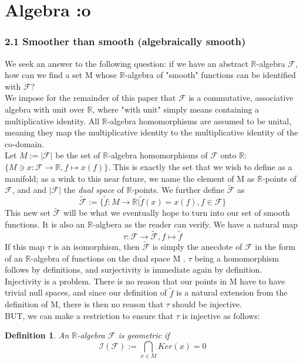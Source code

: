 \documentclass[12pt]{extarticle}
\newcommand\Reals{{\mathbb{R}}}
\newcommand{\ff}{\mathcal{F}}
\newtheorem{definition}{Definition}
\begin{document}
\part{Algebra :o}
\section*{2.1 Smoother than smooth (algebraically smooth)}
We seek an answer to the following question: if we have an abstract $\Reals$-algebra $\ff$, how can we find a set M whose $\Reals$-algebra of "smooth" functions can be identified with $\ff$?\\
We impose for the remainder of this paper that $\ff$ is a commutative, associative algebra with unit over $\Reals$, where "with unit" simply means containing a multiplicative identity. All $\Reals$-algebra homomorphisms are assumed to be unital, meaning they map the multiplicative identity to the multiplicative identity of the co-domain.\\
Let $M:=|\ff|$ be the set of $\Reals$-algebra homomorphisms of $\ff$ onto $\Reals$: $\{M\ni x: \ff\to\Reals, f\mapsto x(f)\}$. This is exactly the set that we wish to define as a manifold; as a wink to this near future, we name the element of M as $\Reals$-points of $\ff$, and and $|\ff|$ the \textit{dual space} of $\Reals$-points. We further define $\tilde{\ff}$ as
\begin{equation}
\tilde{\ff} := \{\tilde{f}:M\to \Reals| \tilde{f}(x) = x(f), f\in\ff\}
\end{equation}
This new set $\tilde{\ff}$ will be what we eventually hope to turn into our set of smooth functions. It is also an $\Reals$-algbera as the reader can verify. We have a natural map
\begin{equation}
\tau:\ff\to\tilde{\ff}, f\mapsto\tilde{f}
\end{equation}
If this map $\tau$ is an isomorphism, then $\tilde{\ff}$ is simply the anecdote of $\ff$ in the form of an $\Reals$-algebra of functions on the dual space M \cite{nestruev}. $\tau$ being a homomorphism follows by definitions, and surjectivity is immediate again by definition. Injectivity is a problem. There is no reason that our points in M have to have trivial null spaces, and since our definition of $\tilde{f}$ is a natural extension from the definition of M, there is then no reason that $\tau$ should be injective.\\
BUT, we can make a restriction to ensure that $\tau$ is injective as follows:
\begin{definition}
An $\Reals$-algebra $\ff$ is geometric if 
\begin{equation}
\mathcal{I}(\ff) := \bigcap_{x\in M} Ker(x) = 0
\end{equation}
\end{definition}
\end{document}

